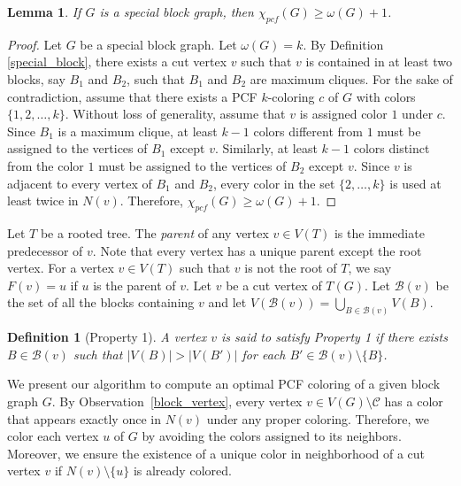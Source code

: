 \documentclass[11pt]{article}
\theoremstyle{plain}
\newtheorem{lemma}{Lemma}
\newtheorem{defi}{Definition}
\begin{document}
	\begin{lemma}\label{spcl_block_bound}
		If $G$ is a special block graph, then $\chi_{pcf}(G) \geq\omega(G) + 1$.
	\end{lemma}
	
	\begin{proof}
		Let $G$ be a special block graph. Let $\omega(G) = k$. 
		By Definition \ref{special_block}, there exists a cut vertex $v$ such that $v$ is contained in at least two blocks, say $B_1$ and $B_2$, such that $B_1$ and $B_2$ are maximum cliques. For the sake of contradiction, assume that there exists a PCF $k$-coloring $c$ of $G$ with colors $\{1, 2, \ldots, k\}$.
		Without loss of generality, assume that $v$ is assigned color $1$ under $c$. Since $B_1$ is a maximum clique, at least $k-1$ colors different from $1$ must be assigned to the vertices of $B_1$ except $v$. Similarly, at least $k-1$ colors distinct from the color $1$ must be assigned to the vertices of $B_2$ except $v$. Since $v$ is adjacent to every vertex of $B_1$ and $B_2$, every color in the set $\{2, \ldots, k\}$ is used at least twice in $N(v)$. Therefore, $\chi_{pcf}(G) \ge \omega(G) + 1$.
	\end{proof}
	
	Let $T$ be a rooted tree. The \emph{parent} of any vertex $v\in V(T)$ is the immediate predecessor of $v$. Note that every vertex has a unique parent except the root vertex. For a vertex $v\in V(T)$ such that $v$ is not the root of $T$, we say $F(v) = u$ if $u$ is the parent of $v$.
	Let $v$ be a cut vertex of $T(G)$. Let $\mathcal{B}(v)$ be the set of all the blocks containing $v$ and let $\displaystyle V(\mathcal{B}(v)) = \bigcup_{B\in \mathcal{B}(v)}V(B)$.
	
	\begin{defi}[\textsf{Property 1}]\label{property_one}
		A vertex $v$ is said to satisfy \textsf{Property 1} if there exists $B\in \mathcal{B}(v)$ such that $|V(B)| > |V(B')|$ for each $B'\in \mathcal{B}(v)\setminus\{B\}$. 
	\end{defi}
	
	We present our algorithm to compute an optimal PCF coloring of a given block graph $G$. By Observation~\ref{block_vertex}, every vertex $v\in V(G)\setminus \mathcal{C}$ has a color that appears exactly once in $N(v)$ under any proper coloring. Therefore, we color each vertex $u$ of $G$ by avoiding the colors assigned to its neighbors. Moreover, we ensure the existence of a unique color in neighborhood of a cut vertex $v$ if $N(v)\setminus\{u\}$ is already colored.
	
\end{document}
